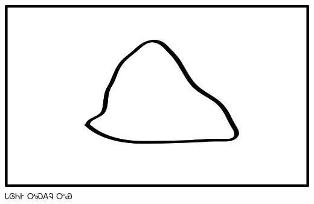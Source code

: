 \documentclass[avery5371]{flashcards}%
\begin{document}
    \begin{flashcard}{
        \includegraphics[width=0.95\columnwidth,height=.51\columnwidth,keepaspectratio]{../artwork/objects-neutral/nvya}
    }
        \Huge ᏓᎶᏂᎨ ᎤᏍᎪᎸ ᏅᏯ
    \end{flashcard}
\end{document}
